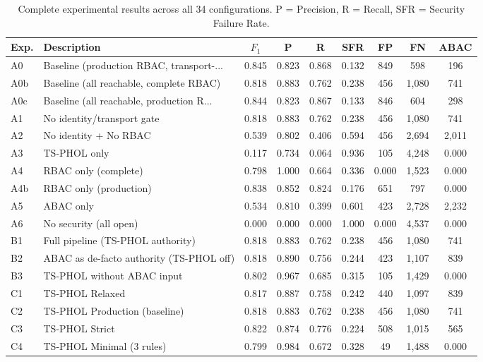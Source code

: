 \begin{table}[t]
\centering
\caption{Complete experimental results across all 34 configurations. P = Precision, R = Recall, SFR = Security Failure Rate.}
\label{tab:full-results}
\scriptsize
\begin{tabular}{@{}llccccccc@{}}
\toprule
Exp. & Description & $F_1$ & P & R & SFR & FP & FN & ABAC \\
\midrule
  A0 & Baseline (production RBAC, transport-... & 0.845 & 0.823 & 0.868 & 0.132 & 849 & 598 & 196 \\
  A0b & Baseline (all reachable, complete RBAC) & 0.818 & 0.883 & 0.762 & 0.238 & 456 & 1,080 & 741 \\
  A0c & Baseline (all reachable, production R... & 0.844 & 0.823 & 0.867 & 0.133 & 846 & 604 & 298 \\
  A1 & No identity/transport gate & 0.818 & 0.883 & 0.762 & 0.238 & 456 & 1,080 & 741 \\
  A2 & No identity + No RBAC & 0.539 & 0.802 & 0.406 & 0.594 & 456 & 2,694 & 2,011 \\
  A3 & TS-PHOL only & 0.117 & 0.734 & 0.064 & 0.936 & 105 & 4,248 & 0.000 \\
  A4 & RBAC only (complete) & 0.798 & 1.000 & 0.664 & 0.336 & 0.000 & 1,523 & 0.000 \\
  A4b & RBAC only (production) & 0.838 & 0.852 & 0.824 & 0.176 & 651 & 797 & 0.000 \\
  A5 & ABAC only & 0.534 & 0.810 & 0.399 & 0.601 & 423 & 2,728 & 2,232 \\
  A6 & No security (all open) & 0.000 & 0.000 & 0.000 & 1.000 & 0.000 & 4,537 & 0.000 \\
\addlinespace
  B1 & Full pipeline (TS-PHOL authority) & 0.818 & 0.883 & 0.762 & 0.238 & 456 & 1,080 & 741 \\
  B2 & ABAC as de-facto authority (TS-PHOL off) & 0.818 & 0.890 & 0.756 & 0.244 & 423 & 1,107 & 839 \\
  B3 & TS-PHOL without ABAC input & 0.802 & 0.967 & 0.685 & 0.315 & 105 & 1,429 & 0.000 \\
\addlinespace
  C1 & TS-PHOL Relaxed & 0.817 & 0.887 & 0.758 & 0.242 & 440 & 1,097 & 839 \\
  C2 & TS-PHOL Production (baseline) & 0.818 & 0.883 & 0.762 & 0.238 & 456 & 1,080 & 741 \\
  C3 & TS-PHOL Strict & 0.822 & 0.874 & 0.776 & 0.224 & 508 & 1,015 & 565 \\
  C4 & TS-PHOL Minimal (3 rules) & 0.799 & 0.984 & 0.672 & 0.328 & 49 & 1,488 & 0.000 \\

\end{tabular}
\end{table}
